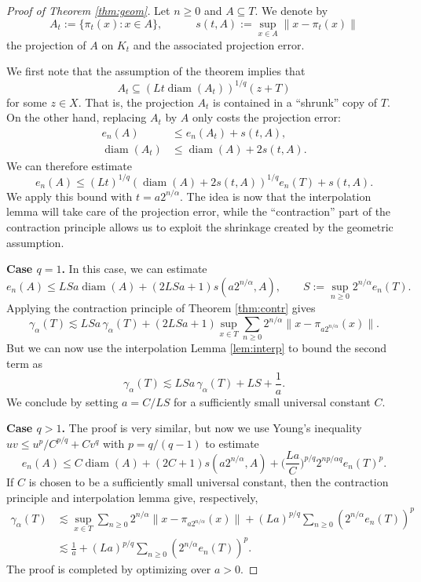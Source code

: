 \documentclass[10pt,reqno]{amsart}
\theoremstyle{definition}
\numberwithin{equation}{section}
\numberwithin{figure}{section}
\numberwithin{table}{section}
\newcommand{\diam}{\mathop{\mathrm{diam}}}
\begin{document}
\begin{proof}[Proof of Theorem \ref{thm:geom}]
Let $n\ge 0$ and $A\subseteq T$. We denote by
$$
	A_t := \{\pi_t(x):x\in A\},\qquad\quad
	s(t,A) := \sup_{x\in A}\|x-\pi_t(x)\|
$$
the projection of $A$ on $K_t$ and the associated projection error. 

We first note that the assumption of the theorem implies that
$$
	A_t \subseteq (Lt\diam(A_t))^{1/q}(z+T)
$$
for some $z\in X$. That is, the projection $A_t$ is contained in a 
``shrunk'' copy of $T$. On the other hand, replacing $A_t$ by $A$ only 
costs the projection error:
\begin{align*}
	e_n(A) &\le e_n(A_t) + s(t,A),\\
	\diam(A_t) &\le \diam(A) + 2s(t,A).
\end{align*}
We can therefore estimate
$$
	e_n(A) \le
	(Lt)^{1/q}(\diam(A) + 2s(t,A))^{1/q}e_n(T)
	+ s(t,A).
$$
We apply this bound with $t=a2^{n/\alpha}$. The idea is now
that the interpolation lemma will take care of the projection error, 
while the ``contraction'' part of the contraction principle allows us to 
exploit the shrinkage created by the geometric assumption.

\textbf{Case $q=1$.} In this case, we can estimate
$$
	e_n(A) \le
	LSa\diam(A) + (2LSa+1)s(a2^{n/\alpha},A),\qquad
	S:=\sup_{n\ge 0}2^{n/\alpha}e_n(T).
$$
Applying the contraction principle of Theorem \ref{thm:contr} gives
$$
	\gamma_\alpha(T) \lesssim
	LSa\,\gamma_\alpha(T) +
	(2LSa+1)
	\sup_{x\in T}\sum_{n\ge 0}2^{n/\alpha}\|x-\pi_{a2^{n/\alpha}}(x)\|.
$$
But we can now use the interpolation Lemma 
\ref{lem:interp} to bound the second term as
$$
	\gamma_\alpha(T) \lesssim
	LSa\,\gamma_\alpha(T) +
	LS+\frac{1}{a}.
$$
We conclude by setting $a= C/LS$ for a sufficiently small universal 
constant $C$.

\textbf{Case $q>1$.} The proof is very similar, but now we use Young's 
inequality $uv \le u^p/C^{p/q} + Cv^q$ with $p=q/(q-1)$ to estimate
$$
	e_n(A) \le
	C\diam(A)
	+ (2C+1)s(a2^{n/\alpha},A)
	+ \bigg(\frac{La}{C}\bigg)^{p/q}
	2^{np/\alpha q}e_n(T)^p.
$$
If $C$ is chosen to be a 
sufficiently small universal constant, then the contraction principle
and interpolation lemma give, respectively,
\begin{align*}
	\gamma_\alpha(T) &\lesssim
	\sup_{x\in T}\sum_{n\ge 0}2^{n/\alpha}\|x-\pi_{a2^{n/\alpha}}(x)\|
	+
	(La)^{p/q}
	\sum_{n\ge 0}(2^{n/\alpha}e_n(T))^p \\
	&\lesssim
	\frac{1}{a} + 
	(La)^{p/q}
	\sum_{n\ge 0}(2^{n/\alpha}e_n(T))^p.
\end{align*}
The proof is completed by optimizing over $a>0$.
\end{proof}
\end{document}

